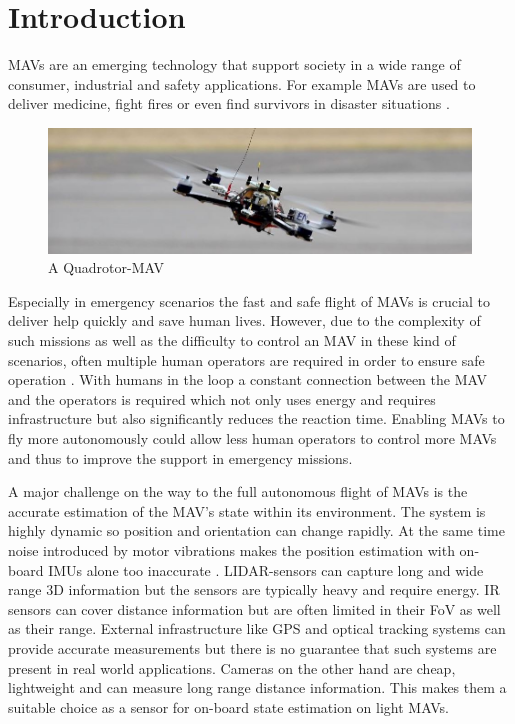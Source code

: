 \chapter{Introduction}
\label{sec:intro}

\acp{MAV} are an emerging technology that support society in a wide range of consumer, industrial and safety applications. For example \acp{MAV} are used to deliver medicine\cite{Shankland2018}, fight fires \cite{KateBaggaley2017} or even find survivors in disaster situations \cite{JoshuaBateman2017}.

\begin{figure}[b]
	\centering
	\includegraphics[width=\textwidth]{fig/mav}
	\caption{A Quadrotor-\ac{MAV}}
	\label{fig:mav}
\end{figure}


Especially in emergency scenarios the fast and safe flight of \acp{MAV} is crucial to deliver help quickly and save human lives. However, due to the complexity of such missions as well as the difficulty to control an \ac{MAV} in these kind of scenarios, often multiple human operators are required in order to ensure safe operation \cite{Murphy2016}. With humans in the loop a constant connection between the \ac{MAV} and the operators is required which not only uses energy and requires infrastructure but also significantly reduces the reaction time. Enabling \acp{MAV} to fly more autonomously could allow less human operators to control more \acp{MAV} and thus to improve the support in emergency missions.

A major challenge on the way to the full autonomous flight of \acp{MAV} is the accurate estimation of the \ac{MAV}'s state within its environment. The system is highly dynamic so position and orientation can change rapidly. At the same time noise introduced by motor vibrations makes the position estimation with on-board \acp{IMU} alone too inaccurate \cite{Mohamed2014}. \ac{LIDAR}-sensors can capture long and wide range 3D information but the sensors are typically heavy and require energy. \ac{IR} sensors can cover distance information but are often limited in their \ac{FoV} as well as their range. External infrastructure like \ac{GPS} and optical tracking systems can provide accurate measurements but there is no guarantee that such systems are present in real world applications. Cameras on the other hand are cheap, lightweight and can measure long range distance information. This makes them a suitable choice as a sensor for on-board state estimation on light \acp{MAV}\cite{Elbanhawi2017}.

